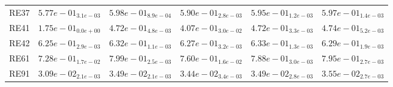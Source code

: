 \documentclass{article}
\begin{document}
\begin{table}
\begin{scriptsize}
\begin{tabular}{llllll}
RE37 & $  5.77e-01_{ 3.1e-03}$ & \cellcolor{gray95}$  5.98e-01_{ 8.9e-04}$ & $  5.90e-01_{ 2.8e-03}$ & $  5.95e-01_{ 1.2e-03}$ & \cellcolor{gray25}$  5.97e-01_{ 1.4e-03}$ \\
RE41 & $  1.75e-01_{ 0.0e+00}$ & \cellcolor{gray25}$  4.72e-01_{ 4.8e-03}$ & $  4.07e-01_{ 3.0e-02}$ & $  4.72e-01_{ 3.3e-03}$ & \cellcolor{gray95}$  4.74e-01_{ 5.2e-03}$ \\
RE42 & $  6.25e-01_{ 2.9e-03}$ & \cellcolor{gray25}$  6.32e-01_{ 1.1e-03}$ & $  6.27e-01_{ 3.2e-03}$ & \cellcolor{gray95}$  6.33e-01_{ 1.3e-03}$ & $  6.29e-01_{ 1.9e-03}$ \\
RE61 & $  7.28e-01_{ 1.7e-02}$ & \cellcolor{gray95}$  7.99e-01_{ 2.5e-03}$ & $  7.60e-01_{ 1.6e-02}$ & $  7.88e-01_{ 3.0e-03}$ & \cellcolor{gray25}$  7.95e-01_{ 2.7e-03}$ \\
RE91 & $  3.09e-02_{ 2.1e-03}$ & $  3.49e-02_{ 2.1e-03}$ & $  3.44e-02_{ 3.4e-03}$ & \cellcolor{gray25}$  3.49e-02_{ 2.8e-03}$ & \cellcolor{gray95}$  3.55e-02_{ 2.7e-03}$ \\
\hline
\end{tabular}
\end{scriptsize}
\end{table}
\end{document}
